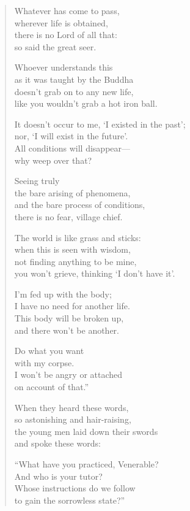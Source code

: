 \documentclass[12pt,openany]{book}%
\begin{document}
\begin{verse}
Whatever has come to pass, \\
wherever life is obtained, \\
there is no Lord of all that: \\
so said the great seer. 

Whoever understands this \\
as it was taught by the Buddha \\
doesn’t grab on to any new life, \\
like you wouldn’t grab a hot iron ball. 

It doesn’t occur to me, ‘I existed in the past’; \\
nor, ‘I will exist in the future’. \\
All conditions will disappear—\\
why weep over that? 

Seeing truly \\
the bare arising of phenomena, \\
and the bare process of conditions, \\
there is no fear, village chief. 

The world is like grass and sticks: \\
when this is seen with wisdom, \\
not finding anything to be mine, \\
you won’t grieve, thinking ‘I don’t have it’. 

I’m fed up with the body; \\
I have no need for another life. \\
This body will be broken up, \\
and there won’t be another. 

Do what you want \\
with my corpse. \\
I won’t be angry or attached \\
on account of that.” 

When they heard these words, \\
so astonishing and hair-raising, \\
the young men laid down their swords \\
and spoke these words: 

“What have you practiced, Venerable? \\
And who is your tutor? \\
Whose instructions do we follow \\
to gain the sorrowless state?” 


\end{verse}
\end{document}
